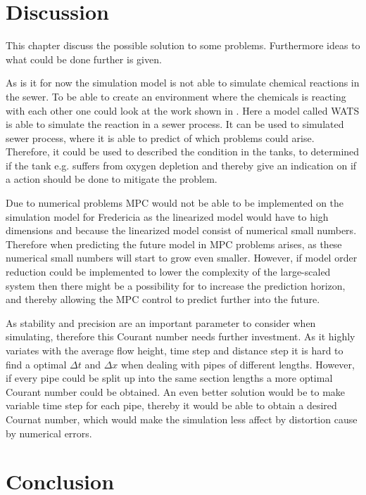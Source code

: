 \chapter{Discussion}\label{ch:discussion}
This chapter discuss the possible solution to some problems. Furthermore ideas to what could be done further is given. 

As is it for now the simulation model is not able to simulate chemical reactions in the sewer. To be able to create an environment where the chemicals is reacting with each other one could look at the work shown in \cite{Sewer_processes}. Here a model called WATS is able to simulate the reaction in a sewer process. It can be used to simulated sewer process, where it is able to predict of which problems could arise. Therefore, it could be used to described the condition in the tanks, to determined if the tank e.g. suffers from oxygen depletion and thereby give an indication on if a action should be done to mitigate the problem.   

Due to numerical problems MPC would not be able to be implemented on the simulation model for Fredericia as the linearized model would have to high dimensions and because the linearized model consist of numerical small numbers. Therefore when predicting the future model in MPC problems arises, as these numerical small numbers will start to grow even smaller. However, if model order reduction could be implemented to lower the complexity of the large-scaled system then there might be a possibility for to increase the prediction horizon, and thereby allowing the MPC control to predict further into the future. 

As stability and precision are an important parameter to consider when simulating, therefore this Courant number needs further investment. As it highly variates with the average flow height, time step and distance step it is hard to find a optimal $\Delta t$ and $\Delta x$ when dealing with pipes of different lengths. However, if every pipe could be split up into the same section lengths a more optimal Courant number could be obtained. An even better solution would be to make variable time step for each pipe, thereby it would be able to obtain a desired Cournat number, which would make the simulation less affect by distortion cause by numerical errors. 

\chapter{Conclusion}\label{ch:conclusion}

